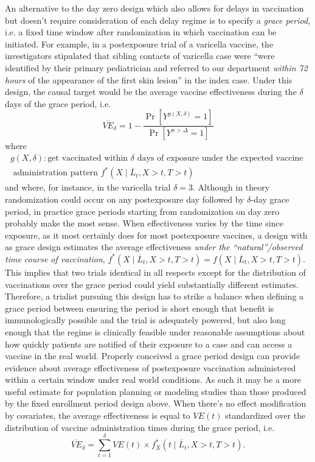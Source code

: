 \begin{appendix}
    An alternative to the day zero design which also allows for delays in vaccination but doesn't require consideration of each delay regime is to specify a \textit{grace period}, i.e. a fixed time window after randomization in which vaccination can be initiated. For example, in a postexposure trial of a varicella vaccine, the investigators stipulated that sibling contacts of varicella case were ``were identified by their primary pediatrician and referred to our department \textit{within 72 hours} of the appearance of the first skin lesion'' in the index case. Under this design, the causal target would be the average vaccine effectiveness during the $\delta$ days of the grace period, i.e.
    $$
    \overline{VE}_\delta = 1 - \frac{\Pr[Y^{g(X,\delta)} = 1]}{\Pr[Y^{x > \Delta} = 1]}
    $$ 
    where
    \begin{gather*}
        g(X,\delta): \text{get vaccinated within $\delta$ days of exposure under the expected vaccine } \\ \text{ administration pattern }  f^*(X \mid \overline{L}_t, X > t, T > t)
    \end{gather*}
    and where, for instance, in the varicella trial $\delta = 3$. Although in theory randomization could occur on any postexposure day followed by $\delta$-day grace period, in practice grace periods starting from randomization on day zero probably make the most sense. When effectiveness varies by the time since exposure, as it most certainly does for most postexposure vaccines, a design with as grace design estimates the average effectiveness \textit{under the ``natural''/observed time course of vaccination}, $f^*(X \mid \overline{L}_t, X > t, T > t) = f(X \mid \overline{L}_t, X > t, T > t)$. This implies that two trials identical in all respects except for the distribution of vaccinations over the grace period could yield substantially different estimates. Therefore, a trialist pursuing this design has to strike a balance when defining a grace period between ensuring the period is short enough that benefit is immunologically possible and the trial is adequately powered, but also long enough that the regime is clinically feasible under reasonable assumptions about how quickly patients are notified of their exposure to a case and can access a vaccine in the real world. Properly conceived a grace period design can provide evidence about average effectiveness of postexposure vaccination administered within a certain window under real world conditions. As such it may be a more useful estimate for population planning or modeling studies than those produced by the fixed enrollment period design above. When there's no effect modification by covariates, the average effectiveness is equal to $VE(t)$ standardized over the distribution of vaccine administration times during the grace period, i.e.
    $$\overline{VE}_\delta = \sum_{t = 1}^\delta VE(t) \times f^*_X(t \mid \overline{L}_t, X > t, T > t).$$


\end{appendix}
